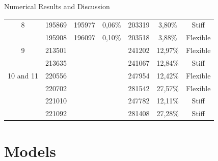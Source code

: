 \documentclass[8pt]{beamer}
\begin{document}
\begin{frame}{Numerical Results and Discussion}
\begin{table}[htbp]
{\begin{tabular}{||c|c|cc|cc|c||}
                    8     & 195869 & 195977 & 0,06\% & 203319 & 3,80\% & Stiff \\
                          & 195908 & 196097 & 0,10\% & 203518 & 3,88\% & Flexible \\
                    9     & 213501 &       &       & 241202 & 12,97\% & Flexible \\
                          & 213635 &       &       & 241067 & 12,84\% & Stiff \\
              {10 and 11} & 220556 &       &       & 247954 & 12,42\% & Flexible \\
                          & 220702 &       &       & 281542 & 27,57\% & Flexible \\
                          & 221010 &       &       & 247782 & 12,11\% & Stiff \\
                          & 221092 &       &       & 281408 & 27,28\% & Stiff \\
                    \hline
                \end{tabular}%
            }
            \end{table}%
        \end{frame}
        


\section{Models}
\end{document}
